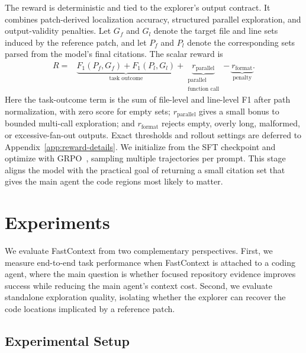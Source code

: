\documentclass[11pt]{article}
\newcommand{\approach}{{FastContext}\xspace}
\begin{document}
The reward is deterministic and tied to the explorer's output contract.
It combines patch-derived localization accuracy, structured parallel exploration, and output-validity penalties.
Let $G_f$ and $G_l$ denote the target file and line sets induced by the reference patch, and let $P_f$ and $P_l$ denote the corresponding sets parsed from the model's final citations.
The scalar reward is
\begin{equation}
\begin{aligned}
R =
&\underbrace{F_1(P_f, G_f) + F_1(P_l, G_l)}_{\text{task outcome}}
+ \underbrace{r_{\mathrm{parallel}}}_{\substack{\text{parallel}\\\text{function call}}}
- \underbrace{r_{\mathrm{format}}}_{\text{penalty}}.
\end{aligned}
\end{equation}
Here the task-outcome term is the sum of file-level and line-level F1 after path normalization, with zero score for empty sets; $r_{\mathrm{parallel}}$ gives a small bonus to bounded multi-call exploration; and $r_{\mathrm{format}}$ rejects empty, overly long, malformed, or excessive-fan-out outputs.
Exact thresholds and rollout settings are deferred to Appendix~\ref{app:reward-details}.
We initialize from the SFT checkpoint and optimize with GRPO~\cite{shao2024deepseekmathpushinglimitsmathematical}, sampling multiple trajectories per prompt.
This stage aligns the model with the practical goal of returning a small citation set that gives the main agent the code regions most likely to matter.

\section{Experiments}
\label{sec:experiments}

We evaluate \approach from two complementary perspectives.
First, we measure end-to-end task performance when FastContext is attached to a coding agent, where the main question is whether focused repository evidence improves success while reducing the main agent's context cost.
Second, we evaluate standalone exploration quality, isolating whether the explorer can recover the code locations implicated by a reference patch.




\subsection{Experimental Setup}
\label{sec:setup}
\end{document}
